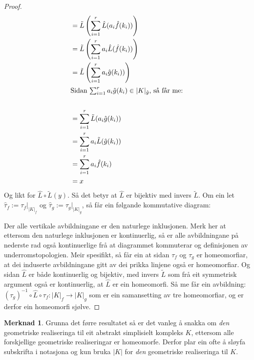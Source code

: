 \documentclass[a4paper, titlepage, 12pt, norsk]{article}
\newcommand{\diagram}[3]{\matrix (#1) [matrix of math nodes,row
  sep={#2},column sep={#3},text height=1.5ex,text
  depth=0.25ex]}
\theoremstyle{plain}
\theoremstyle{definition}
\newtheorem{remark}[theorem]{Merknad}
\newcommand{\R}{\mathbb{R}}
\begin{document}
\begin{proof}
\begin{align*}
	&= \tilde{L}\left(\sum_{i=1}^r\hat{L}(a_i\hat{f}(k_i))\right) \\
	&= \tilde{L}\left(\sum_{i=1}^ra_i\hat{L}(\hat{f}(k_i))\right) \\
	&= \tilde{L}\left(\sum_{i=1}^ra_i\hat{g}(k_i))\right) \\
	\intertext{Sidan $\sum_{i=1}^ra_i\hat{g}(k_i)\in|K|_{\hat{g}}$, så får me:} \\
	&= \sum_{i=1}^r\tilde{L}(a_i\hat{g}(k_i)) \\
	&= \sum_{i=1}^ra_i\tilde{L}(\hat{g}(k_i)) \\
	&= \sum_{i=1}^ra_i\hat{f}(k_i) \\
	&= x
\end{align*}
Og likt for $\hat{L}\circ\tilde{L}(y)$.
Så det betyr at $\hat{L}$ er bijektiv med invers $\tilde{L}$.
Om ein let $\hat{\tau}_f:=\tau_f|_{|K|_f}$ og $\hat{\tau}_g:=\tau_g|_{|K|_g}$, så får ein følgande kommutative diagram:
\begin{center}
\end{center}
Der alle vertikale avbildningane er den naturlege inklusjonen.
Merk her at ettersom den naturlege inklusjonen er kontinuerlig, så er alle avbildningane på nederste rad også kontinuerlige frå at diagrammet kommuterar og definisjonen av underromstopologien. Meir spesifikt, så får ein at sidan $\tau_f$ og $\tau_g$ er homeomorfiar, at dei induserte avbildningane gitt av dei prikka linjene også er homeomorfiar.
Og sidan $\hat{L}$ er både kontinuerlig og bijektiv, med invers $\tilde{L}$ som frå eit symmetrisk argument også er kontinuerlig, at $\hat{L}$ er ein homeomorfi.
Så me får ein avbildning: $(\tau_g)^{-1}\circ\hat{L}\circ\tau_f:|K|_f\to|K|_g$ som er ein samansetting av tre homeomorfiar, og er derfor ein homeomorfi sjølve.
\end{proof}
\begin{remark}
	Grunna det førre resultatet så er det vanleg å snakka om \emph{den} geometriske realiseringa til eit abstrakt simplisielt kompleks $K$, ettersom alle forskjellige geometriske realiseringar er homeomorfe. Derfor plar ein ofte å sløyfa subskrifta i notasjona og kun bruka $|K|$ for \emph{den} geometriske realiseringa til $K$.
\end{remark}
\end{document}
